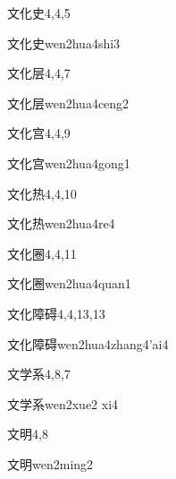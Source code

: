 \begin{entry}{文化史}{4,4,5}
  \begin{phonetics}{文化史}{wen2hua4shi3}
  \end{phonetics}
\end{entry}

\begin{entry}{文化层}{4,4,7}
  \begin{phonetics}{文化层}{wen2hua4ceng2}
  \end{phonetics}
\end{entry}

\begin{entry}{文化宫}{4,4,9}
  \begin{phonetics}{文化宫}{wen2hua4gong1}
  \end{phonetics}
\end{entry}

\begin{entry}{文化热}{4,4,10}
  \begin{phonetics}{文化热}{wen2hua4re4}
  \end{phonetics}
\end{entry}

\begin{entry}{文化圈}{4,4,11}
  \begin{phonetics}{文化圈}{wen2hua4quan1}
  \end{phonetics}
\end{entry}

\begin{entry}{文化障碍}{4,4,13,13}
  \begin{phonetics}{文化障碍}{wen2hua4zhang4'ai4}
  \end{phonetics}
\end{entry}

\begin{entry}{文学系}{4,8,7}
  \begin{phonetics}{文学系}{wen2xue2 xi4}
  \end{phonetics}
\end{entry}

\begin{entry}{文明}{4,8}
  \begin{phonetics}{文明}{wen2ming2}
  \end{phonetics}
\end{entry}


